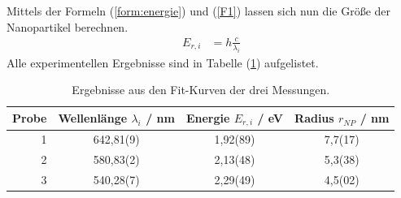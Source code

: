 Mittels der Formeln (\ref{form:energie}) und (\ref{F1}) lassen sich nun die Gr\"{o}{\ss}e der Nanopartikel berechnen.
\begin{align}
	E_{r,i} &= h \frac{c}{\lambda_i} \label{form:energie}
\end{align}
Alle experimentellen Ergebnisse sind in Tabelle (\ref{tab:auf1a}) aufgelistet.
\begin{table}
	\centering
	\caption{Ergebnisse aus den Fit-Kurven der drei Messungen.}
\begin{tabular}{|r|ccc|}
	\hline
	{Probe} & {Wellenl\"{a}nge $\lambda_i$ / nm} & {Energie $E_{r,i}$ / eV} & {Radius $r_{NP}$ / nm} \\
	\hline
	1	& 642,81(9) &	1,92(89)	&	7,7(17)	\\
	2	& 580,83(2) &	2,13(48)	&	5,3(38)	\\
	3	& 540,28(7) &	2,29(49)	&	4,5(02)	\\
	\hline
\end{tabular}
\label{tab:auf1a}
\end{table}

